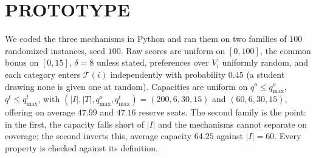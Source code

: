 \documentclass[a4paper,twoside]{article}
\theoremstyle{definition}
\renewcommand{\T}{\mathcal{T}}
\begin{document}



\section{\uppercase{Prototype}}
\label{sec:experiments}

We coded the three mechanisms in Python and ran them on two families of $100$ randomized instances, seed $100$. Raw scores are uniform on $[0,100]$, the common bonus on $[0,15]$, $\delta=8$ unless stated, preferences over $V_i$ uniformly random, and each category enters $\T(i)$ independently with probability $0.45$ (a student drawing none is given one at random). Capacities are uniform on $q^o\le q^o_{\max}$, $q^t\le q^t_{\max}$, with $(|I|,|T|,q^o_{\max},q^t_{\max})=(200,6,30,15)$ and $(60,6,30,15)$, offering on average $47.99$ and $47.16$ reserve seats. The second family is the point: in the first, the capacity falls short of $|I|$ and the mechanisms cannot separate on coverage; the second inverts this, average capacity $64.25$ against $|I|=60$. Every property is checked against its definition.
\end{document}
